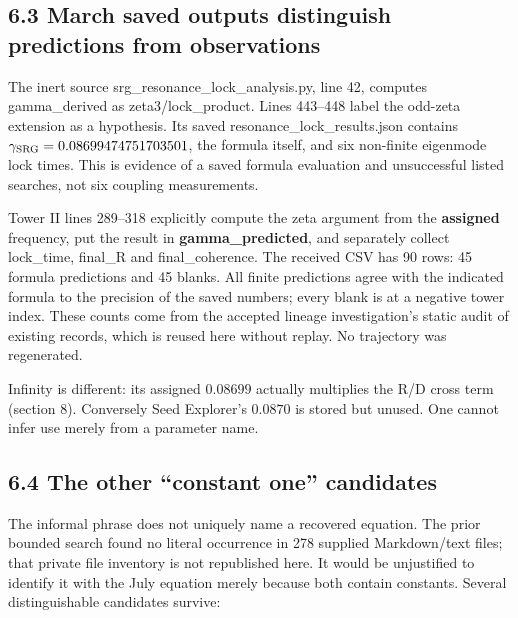 \documentclass[11pt,a4paper]{article}
\begin{document}
\subsection*{6.3 March saved outputs distinguish predictions from observations}

The inert source srg\_\allowbreak{}resonance\_\allowbreak{}lock\_\allowbreak{}analysis.py, line 42, computes gamma\_\allowbreak{}derived as zeta3/lock\_\allowbreak{}product. Lines 443--448 label the odd-zeta extension as a hypothesis. Its saved resonance\_\allowbreak{}lock\_\allowbreak{}results.json contains $\gamma_{\rm SRG}=0.08699474751703501$, the formula itself, and six non-finite eigenmode lock times. This is evidence of a saved formula evaluation and unsuccessful listed searches, not six coupling measurements.


Tower II lines 289--318 explicitly compute the zeta argument from the \textbf{assigned} frequency, put the result in \textbf{gamma\_\allowbreak{}predicted}, and separately collect lock\_\allowbreak{}time, final\_\allowbreak{}R and final\_\allowbreak{}coherence. The received CSV has 90 rows: 45 formula predictions and 45 blanks. All finite predictions agree with the indicated formula to the precision of the saved numbers; every blank is at a negative tower index. These counts come from the accepted lineage investigation's static audit of existing records, which is reused here without replay. No trajectory was regenerated.


Infinity is different: its assigned $0.08699$ actually multiplies the R/D cross term (section 8). Conversely Seed Explorer's $0.0870$ is stored but unused. One cannot infer use merely from a parameter name.


\subsection*{6.4 The other ``constant one'' candidates}

The informal phrase does not uniquely name a recovered equation. The prior bounded search found no literal occurrence in 278 supplied Markdown/text files; that private file inventory is not republished here. It would be unjustified to identify it with the July equation merely because both contain constants. Several distinguishable candidates survive:
\end{document}
